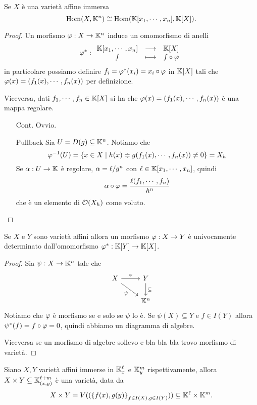 \begin{proposition}[]
Se $X$ \`e una variet\`a affine immersa
\[\operatorname{Hom}(X,\mathbb{K}^n)\cong\operatorname{Hom}(\mathbb{K}[x_1,\cdots, x_n],\mathbb{K}[X]).\]
\end{proposition}
\begin{proof}
Un morfismo $\varphi:X\to \mathbb{K}^n$ induce un omomorfismo di anelli
\[\varphi^\ast:\begin{array}{ccc} {\mathbb{K}[x_1,\cdots, x_n]} & \longrightarrow & {\mathbb{K}[X]}\\ {f} & \longmapsto & {f\circ \varphi} \end{array}\]
in particolare possiamo definire $f_i=\varphi^\ast(x_i)=x_i\circ \varphi$ in $\mathbb{K}[X]$ tali che $\varphi(x)=(f_1(x),\cdots,f_n(x))$ per definizione.

Viceversa, dati $f_1,\cdots, f_n\in\mathbb{K}[X]$ si ha che $\varphi(x)=(f_1(x),\cdots, f_n(x))$ \`e una mappa regolare.
\begin{itemize}
	\item[$\boxed{\text{Cont.}}$] Ovvio.
	\item[$\boxed{\text{Pullback}}$] Sia $U=D(g)\subseteq \mathbb{K}^n$. Notiamo che
	\[\varphi^{-1}(U)=\left\{{x\in X\mid h(x)\doteqdot g(f_1(x),\cdots, f_n(x))\neq 0}\right\}=X_h\]
	Se $\alpha:U\to \mathbb{K}$ \`e regolare, $\alpha=\ell/g^n$ con $\ell\in\mathbb{K}[x_1,\cdots, x_n]$, quindi
	\[\alpha\circ \varphi=\frac{\ell(f_1,\cdots,f_n)}{h^n}\]
	che \`e un elemento di $\mathcal{O}(X_h)$ come voluto.
\end{itemize}
\end{proof}


\begin{proposition}
Se $X$ e $Y$ sono variet\`a affini allora un morfismo $\varphi:X\to Y$ \`e univocamente determinato dall'omomorfismo $\varphi^\ast:\mathbb{K}[Y]\to\mathbb{K}[X]$.
\end{proposition}
\begin{proof}
Sia $\psi:X\to \mathbb{K}^n$ tale che 
	\[\begin{tikzcd}
		X & Y \\
		& {\K^n}
		\arrow["\vp", from=1-1, to=1-2]
		\arrow["\psi"', from=1-1, to=2-2]
		\arrow["\subseteq", from=1-2, to=2-2]
	\end{tikzcd}\]
Notiamo che $\varphi$ \`e morfismo se e solo se $\psi$ lo \`e. Se $\psi(X)\subseteq Y$ e $f\in I(Y)$ allora $\psi^\ast(f)=f\circ \varphi=0$, quindi abbiamo un diagramma di algebre.

Viceversa se un morfismo di algebre sollevo e bla bla bla trovo morfismo di variet\`a.
\end{proof}


\begin{definition}[Prodotto]
Siano $X,Y$ variet\`a affini immerse in $\mathbb{K}^\ell_x$ e $\mathbb{K}^m_y$ rispettivamente, allora $X\times Y\subseteq \mathbb{K}^{\ell+m}_{(x,y)}$ \`e una variet\`a, data da
\[X\times Y=V((\left\{{f(x),g(y)}\right\}_{f\in I(X),g\in I(Y)}))\subseteq \mathbb{K}^\ell\times\mathbb{K}^m.\]
\end{definition}



